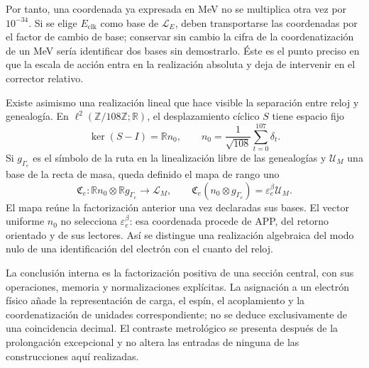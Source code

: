 Por tanto, una coordenada ya expresada en MeV no se multiplica otra vez
por \(10^{-34}\). Si se elige \(E_{\mathrm{clk}}\) como base de
\(\mathcal L_E\), deben transportarse las coordenadas por el factor
de cambio de base; conservar sin cambio la cifra de la coordenatización de un MeV
sería identificar dos bases sin demostrarlo. Éste es el punto preciso
en que la escala de acción entra en la realización absoluta y deja de
intervenir en el corrector relativo.

Existe asimismo una realización lineal que hace visible la separación
entre reloj y genealogía. En
\(\ell^2(\mathbb Z/108\mathbb Z;\mathbb R)\), el desplazamiento
cíclico \(S\) tiene espacio fijo
\[
 \ker(S-I)=\mathbb R n_0,\qquad
 n_0=\frac1{\sqrt{108}}\sum_{t=0}^{107}\delta_t.
\]
Si \(g_{\Gamma_e}\) es el símbolo de la ruta en la linealización libre
de las genealogías y \(\mathcal U_M\) una base de la recta de masa,
queda definido el mapa de rango uno
\begin{equation}
 \mathfrak C_e:
 \mathbb R n_0\otimes\mathbb R g_{\Gamma_e}\longrightarrow\mathcal L_M,
 \qquad
 \mathfrak C_e(n_0\otimes g_{\Gamma_e})
 =\varepsilon_e^\beta\mathcal U_M.
 \label{eq:el-rango-uno}
\end{equation}
El mapa reúne la factorización anterior una vez declaradas sus bases.
El vector uniforme \(n_0\) no selecciona \(\varepsilon_e^\beta\):
esa coordenada procede de APP, del retorno orientado y de sus lectores.
Así se distingue una realización algebraica del modo nulo de una
identificación del electrón con el cuanto del reloj.

La conclusión interna es la factorización positiva de una sección
central, con sus operaciones, memoria y normalizaciones explícitas. La
asignación a un electrón físico añade la representación de carga, el
espín, el acoplamiento y la coordenatización de unidades correspondiente; no se
deduce exclusivamente de una coincidencia decimal. El contraste
metrológico se presenta después de la prolongación excepcional y no altera
las entradas de ninguna de las construcciones aquí realizadas.




